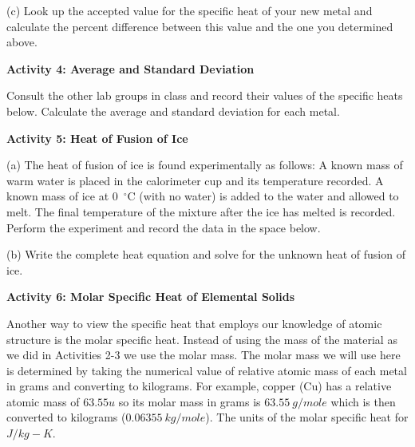\answerspace{2.5cm}

(c) Look up the accepted value for the specific heat of your new metal and
calculate the percent difference between this value and the one you
determined above. 
\answerspace{25mm}

\pagebreak[3]
\textbf{Activity 4: Average and Standard Deviation}

Consult the other lab groups in class and record their values of the specific
heats below.
Calculate the average and standard deviation for each metal.
\answerspace{1.2in}


\textbf{Activity 5: Heat of Fusion of Ice}

(a) The heat of fusion of ice is found experimentally as follows:
A known mass of warm water is placed in the calorimeter cup and its
temperature recorded. A known mass of ice at 0~$^{\circ}$C (with
no water) is added to the water and allowed to melt. The final temperature
of the mixture after the ice has melted is recorded. Perform the experiment
and record the data in the space below.

\answerspace{20mm}

(b) Write the complete heat equation and solve for the unknown heat
of fusion of ice.
\answerspace{25mm}

\textbf{Activity 6: Molar Specific Heat of Elemental Solids}

Another way to view the specific heat that employs our knowledge of atomic structure
is the molar specific heat. 
Instead of using the mass of the material as we did in Activities 2-3 we use the molar mass.
The molar mass we will use here is determined by taking the numerical value of relative atomic mass 
of each metal in grams and converting to kilograms. 
For example, copper (Cu) has a relative atomic mass of $63.55 u$ so its molar mass in grams
is $63.55~g/mole$ which is then converted to kilograms ($0.06355~kg/mole$).
The units of the molar specific heat for $J/kg-K$.

